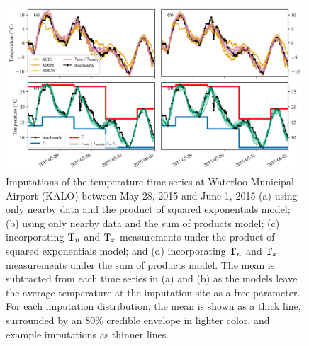 \documentclass[12pt]{article}
\begin{document}
\label{sec:predict_nearby}
\begin{figure}[tb]
\centering
\includegraphics[width=0.99\textwidth]{../figures/imputations_2x2.png}
\caption{\label{fig:imputations_2x2}Imputations of the temperature time series at Waterloo Municipal Airport (KALO) between May 28, 2015 and June 1, 2015 (a) using only nearby data and the product of squared exponentials model; (b) using only nearby data and the sum of products model; (c) incorporating \(\mathrm{T}_{n}\) and \(\mathrm{T}_{x}\) measurements under the product of squared exponentials model; and (d) incorporating \(\mathrm{T}_{n}\) and \(\mathrm{T}_{x}\) measurements under the sum of products model. The mean is subtracted from each time series in (a) and (b) as the models leave the average temperature at the imputation site as a free parameter. For each imputation distribution, the mean is shown as a thick line, surrounded by an 80\% credible envelope in lighter color, and example imputations as thinner lines.}
\end{figure}
\end{document}

